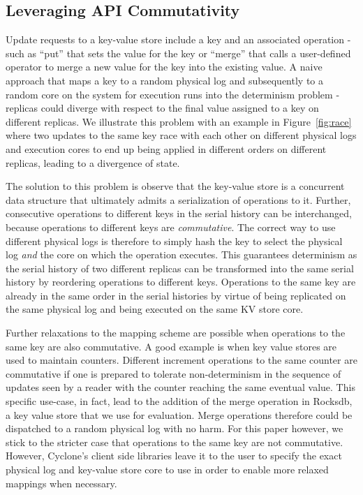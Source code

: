 \documentclass[10pt, preprint, nonatbib]{sigplanconf}
\begin{document}
\subsection{Leveraging API Commutativity}
Update requests to a key-value store include a key and an associated operation -
such as ``put'' that sets the value for the key or ``merge'' that calls a
user-defined operator to merge a new value for the key into the existing value.
A naive approach that maps a key to a random physical log and subsequently to a
random core on the system for execution runs into the determinism problem -
replicas could diverge with respect to the final value assigned to a key on
different replicas. We illustrate this problem with an example in
Figure~\ref{fig:race} where two updates to the same key race with each other on
different physical logs and execution cores to end up being applied in different
orders on different replicas, leading to a divergence of state.

The solution to this problem is observe that the key-value store is a concurrent
data structure that ultimately admits a serialization of operations to
it. Further, consecutive operations to different keys in the serial history can
be interchanged, because operations to different keys are
\emph{commutative}. The correct way to use different physical logs is therefore
to simply hash the key to select the physical log \emph{and} the core on which
the operation executes. This guarantees determinism as the serial history of
two different replicas can be transformed into the same serial history by
reordering operations to different keys. Operations to the same key are already
in the same order in the serial histories by virtue of being replicated on the
same physical log and being executed on the same KV store core.

Further relaxations to the mapping scheme are possible when operations to the
same key are also commutative. A good example is when key value stores are used
to maintain counters. Different increment operations to the same counter are
commutative if one is prepared to tolerate non-determinism in the sequence of
updates seen by a reader with the counter reaching the same eventual value. This
specific use-case, in fact, lead to the addition of the merge operation in
Rocksdb, a key value store that we use for evaluation. Merge operations
therefore could be dispatched to a random physical log with no harm. For this
paper however, we stick to the stricter case that operations to the same
key are not commutative. However, Cyclone's client side libraries leave it to
the user to specify the exact physical log and key-value store core to use in
order to enable more relaxed mappings when necessary.
\end{document}
